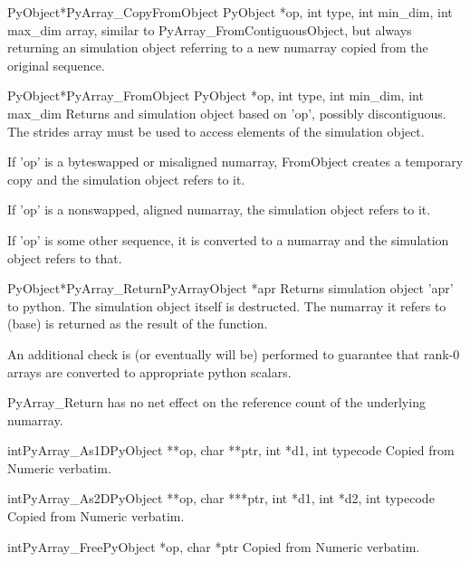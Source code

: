 \begin{cfuncdesc}{PyObject*}{PyArray_CopyFromObject}{%
      PyObject *op, int type, int min_dim, int max_dim}%
   array, similar to PyArray_FromContiguousObject, but always returning an
   simulation object referring to a new numarray copied from the original
   sequence.
\end{cfuncdesc}

\begin{cfuncdesc}{PyObject*}{PyArray_FromObject}{%
      PyObject  *op, int type, int min_dim, int max_dim}%
   Returns and simulation object based on 'op', possibly discontiguous.  The
   strides array must be used to access elements of the simulation object.
   
   If 'op' is a byteswapped or misaligned numarray, FromObject creates a
   temporary copy and the simulation object refers to it.
   
   If 'op' is a nonswapped, aligned numarray, the simulation object refers to
   it.
   
   If 'op' is some other sequence, it is converted to a numarray and the
   simulation object refers to that.
\end{cfuncdesc}

\begin{cfuncdesc}{PyObject*}{PyArray_Return}{PyArrayObject *apr}
   Returns simulation object 'apr' to python.  The simulation object itself is
   destructed.  The numarray it refers to (base) is returned as the result of
   the function.
   
   An additional check is (or eventually will be) performed to guarantee that
   rank-0 arrays are converted to appropriate python scalars.
   
   PyArray_Return has no net effect on the reference count of the underlying
   numarray.
\end{cfuncdesc}

\begin{cfuncdesc}{int}{PyArray_As1D}{PyObject **op, char **ptr, int *d1, int typecode}
   Copied from Numeric verbatim.
\end{cfuncdesc}

\begin{cfuncdesc}{int}{PyArray_As2D}{PyObject **op, char ***ptr, int *d1, int *d2, int typecode}
   Copied from Numeric verbatim.
\end{cfuncdesc}

\begin{cfuncdesc}{int}{PyArray_Free}{PyObject *op, char *ptr}
   Copied from Numeric verbatim. 
\end{cfuncdesc}

